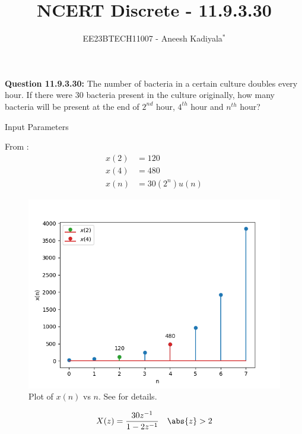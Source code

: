 \documentclass[journal,12pt,twocolumn]{IEEEtran}
\theoremstyle{remark}
\begin{document}

\vspace{3cm}

\title{NCERT Discrete - 11.9.3.30}
\author{EE23BTECH11007 - Aneesh Kadiyala$^{*}$%
}
\maketitle
\newpage
\bigskip

\renewcommand{\thefigure}{\theenumi}
\renewcommand{\thetable}{\theenumi}

\vspace{3cm}
\textbf{Question 11.9.3.30:} The number of bacteria in a certain culture doubles every hour. If there were 30 bacteria present in the culture originally, how many bacteria will be present at the end of $2^{nd}$ hour, $4^{th}$ hour and $n^{th}$ hour?
\\
\solution
\fi
\begin{table}[h!]
    
    \caption{Input Parameters}
    \label{tab:ncert_maths_11_9_3_30}
\end{table}
From :
\begin{align}
x(2) &= 120 \\
x(4) &= 480 \\
x(n) &= 30(2^n)u(n)
\end{align}
\begin{figure}[h!]
    \centering
    \includegraphics[width=\columnwidth]{ncert-maths/11/9/3/30/figs/11_9_3_30.png}
    \caption{Plot of $x(n)$ vs $n$. See  for details.}
    \label{fig:ncert_maths_11_9_3_30}
\end{figure}
\begin{align}
X(z) = \frac{30z^{-1}}{1 - 2z^{-1}} \quad \abs{z} > 2
\end{align}
\end{document}
